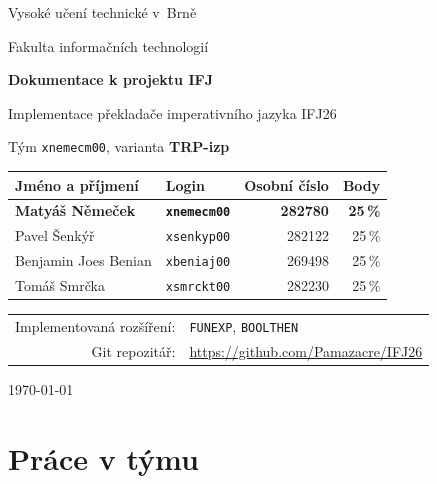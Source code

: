 \documentclass[a4paper,11pt]{article}
\newcommand{\id}[1]{\texttt{#1}}
\begin{document}
\begin{titlepage}
  \centering
  {\Large Vysoké učení technické v~Brně\par}
  {\large Fakulta informačních technologií\par}
  \vspace{3cm}
  {\Huge\bfseries Dokumentace k projektu IFJ\par}
  \vspace{0.5cm}
  {\Large Implementace překladače imperativního jazyka IFJ26\par}
  \vspace{2cm}

  {\large Tým \id{xnemecm00}, varianta \textbf{TRP-izp}\par}
  \vspace{1.5cm}

  \begin{tabular}{l l r r}
    \toprule
    \textbf{Jméno a příjmení} & \textbf{Login} & \textbf{Osobní číslo} & \textbf{Body} \\
    \midrule
    \textbf{Matyáš Němeček} & \textbf{\id{xnemecm00}} & \textbf{282780} & \textbf{25\,\%} \\
    Pavel Šenkýř            & \id{xsenkyp00}          & 282122          & 25\,\% \\
    Benjamin Joes Benian              & \id{xbeniaj00}          & 269498          & 25\,\% \\
    Tomáš Smrčka            & \id{xsmrckt00}          & 282230          & 25\,\% \\
    \bottomrule
  \end{tabular}

  \vspace{1.5cm}
  \begin{tabular}{r l}
    Implementovaná rozšíření: & \id{FUNEXP}, \id{BOOLTHEN} \\
    Git repozitář:            & \url{https://github.com/Pamazacre/IFJ26} \\
  \end{tabular}

  \vfill
  {\large \today\par}
\end{titlepage}

\tableofcontents
\newpage

\section{Práce v týmu}
\end{document}
